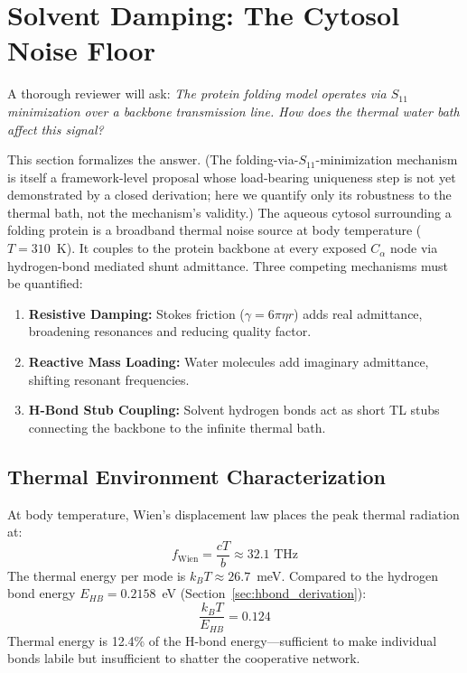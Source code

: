 \section{Solvent Damping: The Cytosol Noise Floor}
\label{sec:solvent_damping}

A thorough reviewer will ask: \textit{The protein folding model operates via $S_{11}$ minimization over a backbone transmission line. How does the thermal water bath affect this signal?}

This section formalizes the answer. (The folding-via-$S_{11}$-minimization mechanism is itself a framework-level proposal whose load-bearing uniqueness step is not yet demonstrated by a closed derivation; here we quantify only its robustness to the thermal bath, not the mechanism's validity.) The aqueous cytosol surrounding a folding protein is a broadband thermal noise source at body temperature ($T = 310$~K). It couples to the protein backbone at every exposed $C_\alpha$ node via hydrogen-bond mediated shunt admittance. Three competing mechanisms must be quantified:

\begin{enumerate}
    \item \textbf{Resistive Damping:} Stokes friction ($\gamma = 6\pi\eta r$) adds real admittance, broadening resonances and reducing quality factor.
    \item \textbf{Reactive Mass Loading:} Water molecules add imaginary admittance, shifting resonant frequencies.
    \item \textbf{H-Bond Stub Coupling:} Solvent hydrogen bonds act as short TL stubs connecting the backbone to the infinite thermal bath.
\end{enumerate}

\subsection{Thermal Environment Characterization}

At body temperature, Wien's displacement law places the peak thermal radiation at:
\begin{equation}
    f_\text{Wien} = \frac{cT}{b} \approx 32.1 \text{ THz}
\end{equation}
The thermal energy per mode is $k_B T \approx 26.7$~meV. Compared to the hydrogen bond energy $E_{HB} = 0.2158$~eV (Section~\ref{sec:hbond_derivation}):
\begin{equation}
    \frac{k_B T}{E_{HB}} = 0.124
\end{equation}
Thermal energy is 12.4\% of the H-bond energy---sufficient to make individual bonds labile but insufficient to shatter the cooperative network.

